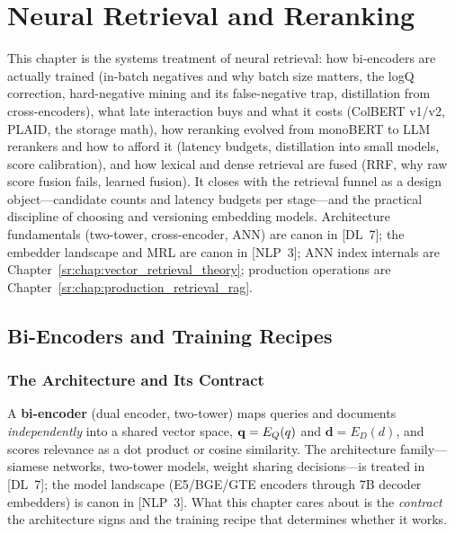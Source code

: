 \chapter{Neural Retrieval and Reranking}
\label{sr:chap:neural_retrieval_reranking}

\begin{tldr}
This chapter is the systems treatment of neural retrieval: how bi-encoders are actually trained (in-batch negatives and why batch size matters, the logQ correction, hard-negative mining and its false-negative trap, distillation from cross-encoders), what late interaction buys and what it costs (ColBERT v1/v2, PLAID, the storage math), how reranking evolved from monoBERT to LLM rerankers and how to afford it (latency budgets, distillation into small models, score calibration), and how lexical and dense retrieval are fused (RRF, why raw score fusion fails, learned fusion). It closes with the retrieval funnel as a design object---candidate counts and latency budgets per stage---and the practical discipline of choosing and versioning embedding models. Architecture fundamentals (two-tower, cross-encoder, ANN) are canon in [DL~7]; the embedder landscape and MRL are canon in [NLP~3]; ANN index internals are Chapter~\ref{sr:chap:vector_retrieval_theory}; production operations are Chapter~\ref{sr:chap:production_retrieval_rag}.
\end{tldr}

\section{Bi-Encoders and Training Recipes}
\label{sr:sec:bi_encoder_retrieval}

\subsection{The Architecture and Its Contract}
\label{sr:subsec:bi_encoder_contract}

A \textbf{bi-encoder} (dual encoder, two-tower) maps queries and documents \textit{independently} into a shared vector space, $\mathbf{q} = E_Q(q)$ and $\mathbf{d} = E_D(d)$, and scores relevance as a dot product or cosine similarity. The architecture family---siamese networks, two-tower models, weight sharing decisions---is treated in [DL~7]; the model landscape (E5/BGE/GTE encoders through 7B decoder embedders) is canon in [NLP~3]. What this chapter cares about is the \textit{contract} the architecture signs and the training recipe that determines whether it works.

